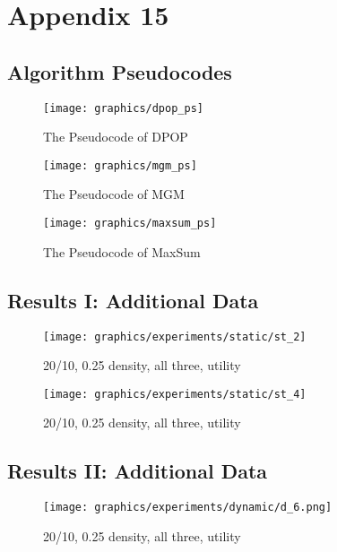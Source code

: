 \chapter{Appendix 15}
\label{a:appendix}

\section{Algorithm Pseudocodes}
\begin{figure}[H]
\texttt{[image: graphics/dpop\_ps]}
\centering
\caption{The Pseudocode of DPOP}
\label{fig:dpopps}
\end{figure}
\begin{figure}[H]
\texttt{[image: graphics/mgm\_ps]}
\centering
\caption{The Pseudocode of MGM}
\label{fig:mgmps}
\end{figure}
\begin{figure}[H]
\texttt{[image: graphics/maxsum\_ps]}
\centering
\caption{The Pseudocode of MaxSum}
\label{fig:maxsumps}
\end{figure}

\section{Results I: Additional Data}

\begin{figure}[H]
\centering
\texttt{[image: graphics/experiments/static/st\_2]}
\caption{20/10, 0.25 density, all three, utility}
\label{fig:st_2}
\end{figure}

\begin{figure}[H]
\centering
\texttt{[image: graphics/experiments/static/st\_4]}
\caption{20/10, 0.25 density, all three, utility}
\label{fig:st_3}
\end{figure}

\section{Results II: Additional Data}

\begin{figure}[H]
\centering
\texttt{[image: graphics/experiments/dynamic/d\_6.png]}
\caption{20/10, 0.25 density, all three, utility}
\label{fig:d_6}
\end{figure}